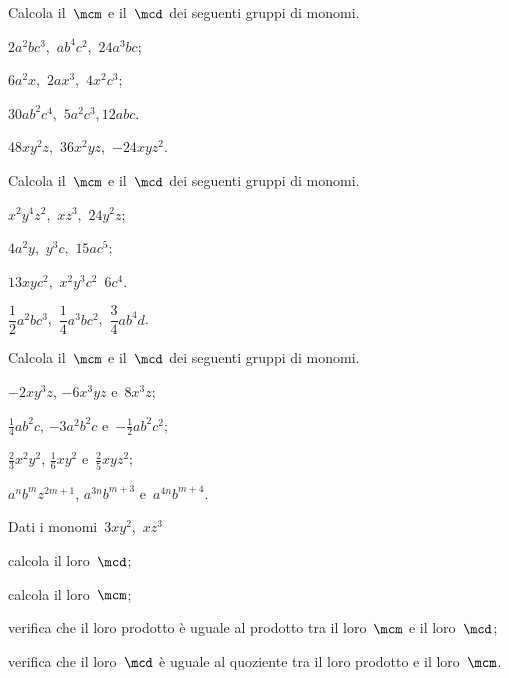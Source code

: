 \begin{esercizio}
 \label{ese:10.47} %
Calcola il~$\mcm$ e il~$\mcd$ dei seguenti gruppi di monomi.
\begin{multicols}{2}
\begin{enumeratea}
 \item $2a^{2}bc^{3}$,\, $ab^{4}c^{2}$,\, $24a^{3}bc$;
 \item $6a^{2}x$,\, $2ax^{3}$,\, $4x^{2}c^{3}$;
 \item $30ab^{2}c^{4}$,\, $5a^{2}c^{3}$,\,$12abc$.
 \item $48xy^2z$,\, $36x^2yz$,\, $-24xyz^2$.
\end{enumeratea}
\end{multicols}
\end{esercizio}

\begin{esercizio}
 \label{ese:10.48} %
Calcola il~$\mcm$ e il~$\mcd$ dei seguenti gruppi di monomi.
\begin{multicols}{2}
\begin{enumeratea}
 \item $x^{2}y^{4}z^{2}$,\, $xz^{3}$,\, $24y^{2}z$;
 \item $4a^{2}y$,\, $y^{3}c$,\, $15ac^{5}$;
 \item $13xyc^{2}$,\, $x^{2}y^{3}c^{2}$\, $6c^{4}$.
 \item $\dfrac{1}{2}a^2bc^3$,\, $\dfrac{1}{4}a^{3}bc^{2}$,\, $\dfrac{3}{4}ab^4d$.
\end{enumeratea}
\end{multicols}
\end{esercizio}

\begin{esercizio}[\Ast]
 \label{ese:10.49} %
Calcola il~$\mcm$ e il~$\mcd$ dei seguenti gruppi di monomi.

\begin{enumeratea}
 \item $-2xy^{3}z$, $-6x^{3}yz$ e~$8x^{3}z$;
 \item $\frac{1}{4}ab^{2}c$, $-3a^{2}b^{2}c$ e~$-{\frac{1}{2}}ab^{2}c^{2}$;
 \item $\frac{2}{3}x^{2}y^{2}$, $\frac{1}{6}xy^{2}$ e~$\frac{2}{5}xyz^{2}$;
 \item $a^{n}b^{m}z^{2m+1}$, $a^{3n}b^{m+3}$ e~$a^{4n}b^{m+4}$.
\end{enumeratea}
\end{esercizio}

\begin{esercizio}
 \label{ese:10.50} %
Dati i monomi~$3xy^{2}$,\, $xz^{3}$

\begin{enumeratea}
\item calcola il loro~$\mcd$;
\item calcola il loro~$\mcm$;
\item verifica che il loro prodotto è uguale al prodotto tra il loro~$\mcm$ e il loro~$\mcd$;
\item verifica che il loro~$\mcd$ è uguale al quoziente tra il loro prodotto e il loro~$\mcm$.
\end{enumeratea}
\end{esercizio}

